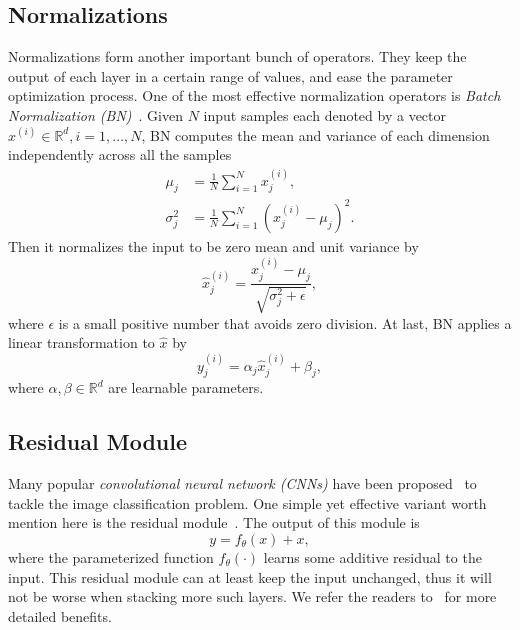 \subsection{Normalizations} %
\label{sub:dl-normalizations}
Normalizations form another important bunch of operators. They keep the output of each layer in a certain range of values, and ease the parameter optimization process. One of the most effective normalization operators is \emph{Batch Normalization (BN)}~\cite{ioffe2015batch}. Given $N$ input samples each denoted by a vector $x^{(i)}\in\mathbb{R}^d, i=1,\dots,N$, BN computes the mean and variance of each dimension independently across all the samples
\begin{align}
  \mu_j &= \frac{1}{N} \sum_{i=1}^N x_j^{(i)},\\
  \sigma_j^2 &= \frac{1}{N} \sum_{i=1}^N (x_j^{(i)} - \mu_j)^2.
\end{align}
Then it normalizes the input to be zero mean and unit variance by
\begin{equation}
  \hat{x}_j^{(i)} = \frac{x_j^{(i)} - \mu_j}{\sqrt{\sigma_j^2 + \epsilon}},
\end{equation}
where $\epsilon$ is a small positive number that avoids zero division. At last, BN applies a linear transformation to $\hat{x}$ by
\begin{equation}
  y_j^{(i)} = \alpha_j \hat{x}_j^{(i)} + \beta_j,
\end{equation}
where $\alpha,\beta\in\mathbb{R}^d$ are learnable parameters.

\subsection{Residual Module} %
\label{sub:dl-residual}
Many popular \emph{convolutional neural network (CNNs)} have been proposed~\cite{krizhevsky2012imagenet,simonyan2014very,szegedy2014going} to tackle the image classification problem. One simple yet effective variant worth mention here is the residual module~\cite{he2015deep}. The output of this module is
\begin{equation}
  y = f_\theta(x) + x,
\end{equation}
where the parameterized function $f_\theta(\cdot)$ learns some additive residual to the input. This residual module can at least keep the input unchanged, thus it will not be worse when stacking more such layers. We refer the readers to~\cite{he2015deep,he2016identity} for more detailed benefits.


